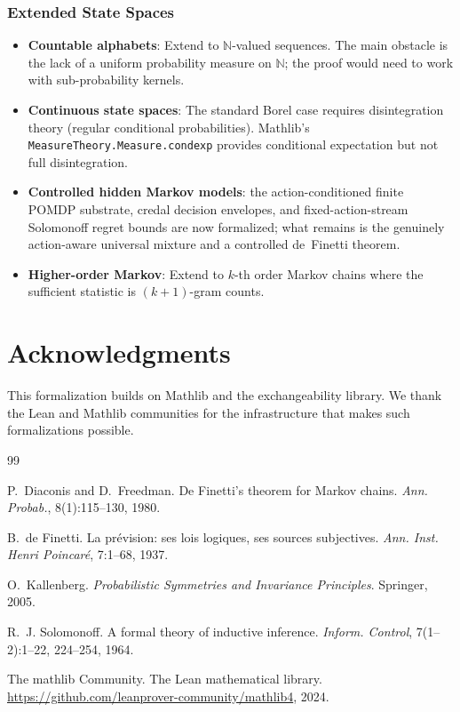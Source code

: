 \documentclass[11pt,a4paper]{article}
\theoremstyle{definition}
\begin{document}
\subsubsection{Extended State Spaces}

\begin{itemize}
\item \textbf{Countable alphabets}: Extend to $\mathbb{N}$-valued sequences.
  The main obstacle is the lack of a uniform probability measure on $\mathbb{N}$;
  the proof would need to work with sub-probability kernels.
\item \textbf{Continuous state spaces}: The standard Borel case requires
  disintegration theory (regular conditional probabilities). Mathlib's
  \texttt{MeasureTheory.Measure.condexp} provides conditional expectation
  but not full disintegration.
\item \textbf{Controlled hidden Markov models}: the action-conditioned finite
  POMDP substrate, credal decision envelopes, and fixed-action-stream
  Solomonoff regret bounds are now formalized; what remains is the genuinely
  action-aware universal mixture and a controlled de~Finetti theorem.
\item \textbf{Higher-order Markov}: Extend to $k$-th order Markov chains
  where the sufficient statistic is $(k+1)$-gram counts.
\end{itemize}

\section*{Acknowledgments}

This formalization builds on Mathlib and the exchangeability library.
We thank the Lean and Mathlib communities for the infrastructure that
makes such formalizations possible.

\begin{thebibliography}{99}

P.~Diaconis and D.~Freedman.
\newblock De Finetti's theorem for Markov chains.
\newblock \emph{Ann. Probab.}, 8(1):115--130, 1980.

B.~de Finetti.
\newblock La pr\'evision: ses lois logiques, ses sources subjectives.
\newblock \emph{Ann. Inst. Henri Poincar\'e}, 7:1--68, 1937.

O.~Kallenberg.
\newblock \emph{Probabilistic Symmetries and Invariance Principles}.
\newblock Springer, 2005.

R.~J. Solomonoff.
\newblock A formal theory of inductive inference.
\newblock \emph{Inform. Control}, 7(1--2):1--22, 224--254, 1964.

The mathlib Community.
\newblock The Lean mathematical library.
\newblock \url{https://github.com/leanprover-community/mathlib4}, 2024.

\end{thebibliography}
\end{document}
